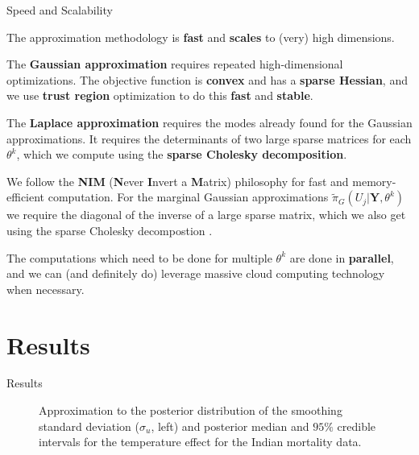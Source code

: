 \documentclass[10pt,usenames,dvipsnames,t]{beamer}
\newcommand{\mb}[1]{\boldsymbol{#1}}
\begin{document}
\begin{frame}{Speed and Scalability \citep{stringernoeps}}

The approximation methodology is \textbf{fast} and \textbf{scales} to (very) high dimensions.
\pause

The \textbf{Gaussian approximation} requires repeated high-dimensional optimizations. The objective function is \textbf{convex} and has a \textbf{sparse Hessian}, and we use \textbf{trust region} optimization \citep{trustoptim} to do this \textbf{fast} and \textbf{stable}.

\pause

The \textbf{Laplace approximation} requires the modes already found for the Gaussian approximations. It requires the determinants of two large sparse matrices for each $\theta^{k}$, which we compute using the \textbf{sparse Cholesky decomposition}.

\pause

We follow the \textbf{NIM} (\textbf{N}ever \textbf{I}nvert a \textbf{M}atrix) philosophy for fast and memory-efficient computation. \pause For the marginal Gaussian approximations $\tilde{\pi}_{G}(U_{j}|\mb{Y},\theta^{k})$ we require the diagonal of the inverse of a large sparse matrix, which we also get using the sparse Cholesky decompostion \citep{gmrfmodels}.

\pause

The computations which need to be done for multiple $\theta^{k}$ are done in \textbf{parallel}, and we can (and definitely do) leverage massive cloud computing technology when necessary.

\end{frame}

\section{Results}

\begin{frame}{Results}

\begin{figure}[t]
\centering
{}
\caption{Approximation to the posterior distribution of the smoothing standard deviation ($\sigma_{u}$, left) and posterior median and $95\%$ credible intervals for the temperature effect for the Indian mortality data.}
\label{fig:casecross}
\end{figure}

\end{frame}
\end{document}

